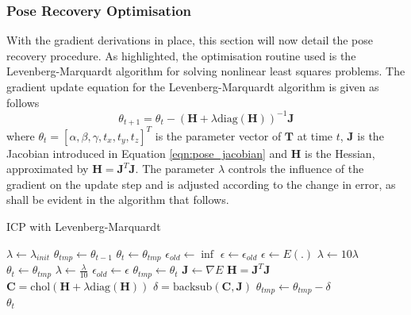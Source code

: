 \subsubsection{Pose Recovery Optimisation}
\label{subsub:moseg_static_camera_poserec_opt}
With the gradient derivations in place, this section will now detail the
pose recovery procedure. As highlighted, the optimisation routine used is the
Levenberg-Marquardt \cite{NumericalRecipes} algorithm for solving nonlinear least
squares problems. The gradient update equation for the Levenberg-Marquardt
algorithm is given as follows
\begin{equation}
  \label{eqn:lm_update}
  \theta_{t+1} = \theta_{t} - (\mathbf{H} + \lambda \text{diag}(
  \mathbf{H}))^{-1}
  \mathbf{J}
\end{equation}
where $\theta_{t} = [\alpha, \beta, \gamma, t_{x}, t_{y}, t_{z}]^{T}$ is the
parameter vector of $\mathbf{T}$ at time $t$, $\mathbf{J}$ is the Jacobian
introduced in Equation \ref{eqn:pose_jacobian} and $\mathbf{H}$ is the Hessian,
approximated by $\mathbf{H} = \mathbf{J}^{T}\mathbf{J}$. The parameter $\lambda$
controls the influence of the gradient on the update step and is adjusted
according to the change in error, as shall be evident in the algorithm
that follows.

{
  \centering
  \singlespacing
  \begin{minipage}{.7\linewidth}
    \begin{algorithm}[H]
      \label{alg:icp}
      \caption{ICP with Levenberg-Marquardt}
      \begin{algorithmic}[1]
        \State $\lambda \gets \lambda_{init}$
        \State $\theta_{tmp} \gets \theta_{t-1}$
        \State $\theta_{t} \gets \theta_{tmp}$
        \State $\epsilon_{old} \gets \inf$
        \State $\epsilon \gets \epsilon_{old}$
        \While{$\epsilon >= \tau$}
        \State $\epsilon \gets E(.)$
        \State $\lambda \gets 10\lambda$
        \State $\theta_{t} \gets \theta_{tmp}$
        \Else
        \State $\lambda \gets \frac{\lambda}{10}$
        \State $\epsilon_{old} \gets \epsilon$
        \State $\theta_{tmp} \gets \theta_{t}$
        \EndIf
        \State $\mathbf{J} \gets \nabla E$
        \State $\mathbf{H} = \mathbf{J}^{T}\mathbf{J}$
        \State $\mathbf{C} = \text{chol}(\mathbf{H} +
        \lambda \text{diag}(\mathbf{H}))$
        \State $\delta = \text{backsub}(\mathbf{C}, \mathbf{J})$
        \State $\theta_{tmp} \gets \theta_{tmp} - \delta$
        \EndWhile\\
        \Return $\theta_{t}$
        \EndProcedure
      \end{algorithmic}
    \end{algorithm}
  \end{minipage}
  \par
}

